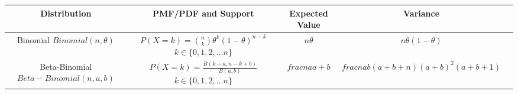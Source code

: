\documentclass[12pt,]{krantz}
\theoremstyle{definition}
\theoremstyle{definition}
\theoremstyle{definition}
\theoremstyle{remark}
\begin{document}
\small
\begin{center}
\renewcommand{\arraystretch}{3.7}
\begin{tabular}{ccccc}
\textbf{Distribution} & \textbf{PMF/PDF and Support} & \textbf{Expected Value}  & \textbf{Variance}\\
\hline 
\shortstack{Binomial \\ $Binomial(n, \theta)$} & \shortstack{$P(X=k) = \binom{n}{k}\theta^k (1-\theta)^{n-k}$  \\ $k \in \{0, 1, 2, \dots n\}$}& $n\theta$ & $n\theta(1-\theta)$ \\
\hline
\shortstack{Beta-Binomial \\ $Beta-Binomial(n, a, b)$} & \shortstack{$P(X=k) = \frac{B(k+a, n-k+b)}{B(a,b)}$  \\ $k \in \{0, 1, 2, \dots n\}$}& $ frac{n a}{a + b} $ & $frac{n a b (a + b+n)}{(a + b)^2(a+b+1)}$ \\
\hline


\end{tabular}
\end{center}
\end{document}
